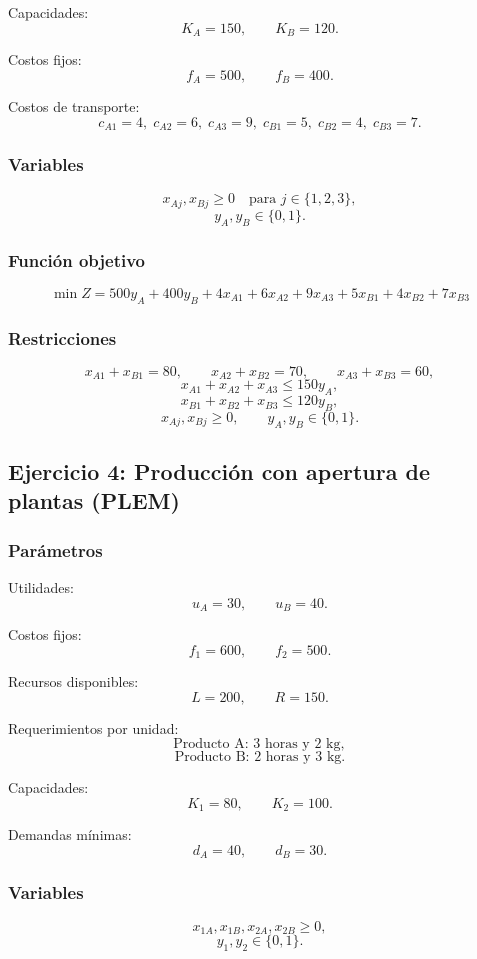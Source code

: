 \documentclass[12pt,a4paper]{article}
\begin{document}
Capacidades:
\[
K_A=150,\qquad K_B=120.
\]

Costos fijos:
\[
f_A=500,\qquad f_B=400.
\]

Costos de transporte:
\[
c_{A1}=4,\; c_{A2}=6,\; c_{A3}=9,\; c_{B1}=5,\; c_{B2}=4,\; c_{B3}=7.
\]

\subsubsection*{Variables}
\[
x_{Aj},x_{Bj}\ge 0 \quad \text{para } j\in\{1,2,3\},
\]
\[
y_A,y_B\in\{0,1\}.
\]

\subsubsection*{Función objetivo}
\[
\min Z = 500y_A + 400y_B + 4x_{A1}+6x_{A2}+9x_{A3}+5x_{B1}+4x_{B2}+7x_{B3}
\]

\subsubsection*{Restricciones}
\[
x_{A1}+x_{B1}=80,\qquad x_{A2}+x_{B2}=70,\qquad x_{A3}+x_{B3}=60,
\]
\[
x_{A1}+x_{A2}+x_{A3}\le 150y_A,
\]
\[
x_{B1}+x_{B2}+x_{B3}\le 120y_B,
\]
\[
x_{Aj},x_{Bj}\ge 0,\qquad y_A,y_B\in\{0,1\}.
\]

\subsection{Ejercicio 4: Producción con apertura de plantas (PLEM)}

\subsubsection*{Parámetros}
Utilidades:
\[
u_A=30,\qquad u_B=40.
\]

Costos fijos:
\[
f_1=600,\qquad f_2=500.
\]

Recursos disponibles:
\[
L=200,\qquad R=150.
\]

Requerimientos por unidad:
\[
\text{Producto A: } 3 \text{ horas y } 2 \text{ kg},
\]
\[
\text{Producto B: } 2 \text{ horas y } 3 \text{ kg}.
\]

Capacidades:
\[
K_1=80,\qquad K_2=100.
\]

Demandas mínimas:
\[
d_A=40,\qquad d_B=30.
\]

\subsubsection*{Variables}
\[
x_{1A},x_{1B},x_{2A},x_{2B}\ge 0,
\]
\[
y_1,y_2\in\{0,1\}.
\]
\end{document}
